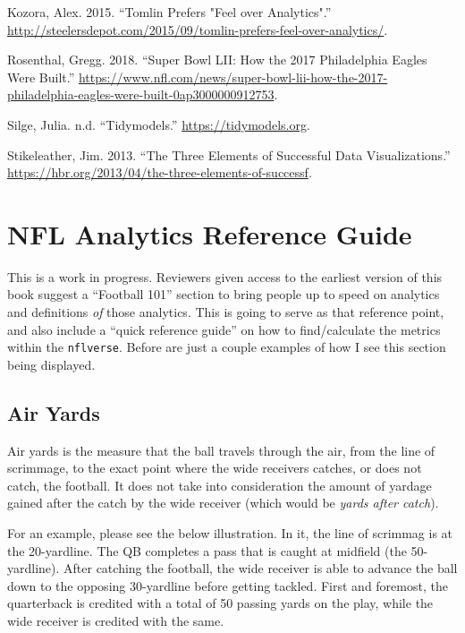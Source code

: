 \documentclass[
  letterpaper,
]{krantz}
\newlength{\cslhangindent}
\newlength{\cslentryspacingunit} %
\newenvironment{CSLReferences}[2] %
 {%
  \setlength{\parindent}{0pt}
  \ifodd #1
  \let\oldpar\par
  \def\par{\hangindent=\cslhangindent\oldpar}
  \fi
  \setlength{\parskip}{#2\cslentryspacingunit}
 }%
 {}
\begin{document}
\begin{CSLReferences}{1}{0}
\leavevmode{}%
Kozora, Alex. 2015. {``Tomlin Prefers "Feel over Analytics".''}
\url{http://steelersdepot.com/2015/09/tomlin-prefers-feel-over-analytics/}.

\leavevmode{}%
Rosenthal, Gregg. 2018. {``Super Bowl LII: How the 2017 Philadelphia
Eagles Were Built.''}
\url{https://www.nfl.com/news/super-bowl-lii-how-the-2017-philadelphia-eagles-were-built-0ap3000000912753}.

\leavevmode{}%
Silge, Julia. n.d. {``Tidymodels.''} \url{https://tidymodels.org}.

\leavevmode{}%
Stikeleather, Jim. 2013. {``The Three Elements of Successful Data
Visualizations.''}
\url{https://hbr.org/2013/04/the-three-elements-of-successf}.

\end{CSLReferences}

\appendix
{}

\hypertarget{sec-appendix-starting}{%
\chapter{NFL Analytics Reference Guide}\label{sec-appendix-starting}}

This is a work in progress. Reviewers given access to the earliest
version of this book suggest a ``Football 101'' section to bring people
up to speed on analytics and definitions \emph{of} those analytics. This
is going to serve as that reference point, and also include a ``quick
reference guide'' on how to find/calculate the metrics within the
\texttt{nflverse}. Before are just a couple examples of how I see this
section being displayed.

\hypertarget{air-yards}{%
\section{Air Yards}\label{air-yards}}

Air yards is the measure that the ball travels through the air, from the
line of scrimmage, to the exact point where the wide receivers catches,
or does not catch, the football. It does not take into consideration the
amount of yardage gained after the catch by the wide receiver (which
would be \emph{yards after catch}).

For an example, please see the below illustration. In it, the line of
scrimmag is at the 20-yardline. The QB completes a pass that is caught
at midfield (the 50-yardline). After catching the football, the wide
receiver is able to advance the ball down to the opposing 30-yardline
before getting tackled. First and foremost, the quarterback is credited
with a total of 50 passing yards on the play, while the wide receiver is
credited with the same.
\end{document}
